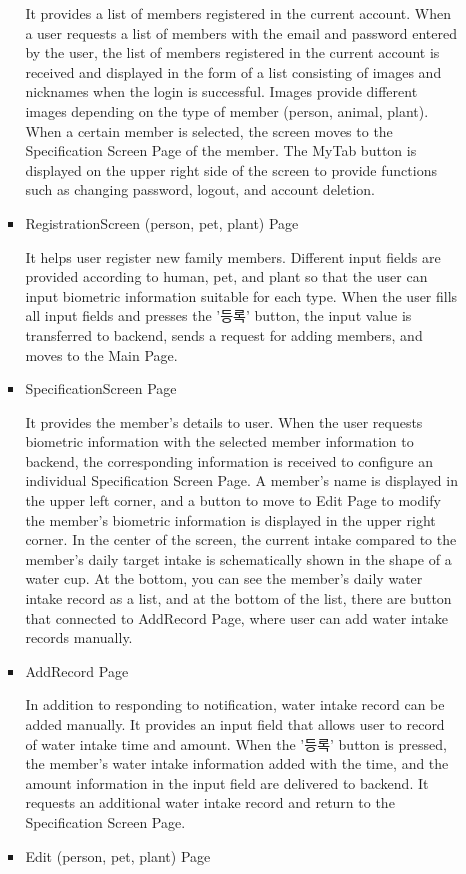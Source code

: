 \documentclass[conference]{IEEEtran}
\begin{document}
\begin{itemize}
\begin{enumerate}
\begin{itemize}
            It provides a list of members registered in the current account. When a user requests a list of members with the email and password entered by the user, the list of members registered in the current account is received and displayed in the form of a list consisting of images and nicknames when the login is successful. Images provide different images depending on the type of member (person, animal, plant). When a certain member is selected, the screen moves to the Specification Screen Page of the member. The MyTab button is displayed on the upper right side of the screen to provide functions such as changing password, logout, and account deletion.
            \item RegistrationScreen (person, pet, plant) Page
            \setlength{\parindent}{2ex}
            
            It helps user register new family members. Different input fields are provided according to human, pet, and plant so that the user can input biometric information suitable for each type. When the user fills all input fields and presses the '등록' button, the input value is transferred to backend, sends a request for adding members, and moves to the Main Page.
            \item SpecificationScreen Page
            \setlength{\parindent}{2ex}
            
            It provides the member's details to user. When the user requests biometric information with the selected member information to backend, the corresponding information is received to configure an individual Specification Screen Page. A member's name is displayed in the upper left corner, and a button to move to Edit Page to modify the member's biometric information is displayed in the upper right corner. In the center of the screen, the current intake compared to the member's daily target intake is schematically shown in the shape of a water cup. At the bottom, you can see the member's daily water intake record as a list, and at the bottom of the list, there are button that connected to AddRecord Page, where user can add water intake records manually.
            \item AddRecord Page
            \setlength{\parindent}{2ex}
            
            In addition to responding to notification, water intake record can be added manually. It provides an input field that allows user to record of water intake time and amount. When the '등록' button is pressed, the member's water intake information added with the time, and the amount information in the input field are delivered to backend. It requests an additional water intake record and return to the Specification Screen Page.
            \item Edit (person, pet, plant) Page
            \setlength{\parindent}{2ex}
            

\end{itemize}
\end{enumerate}
\end{itemize}
\end{document}
